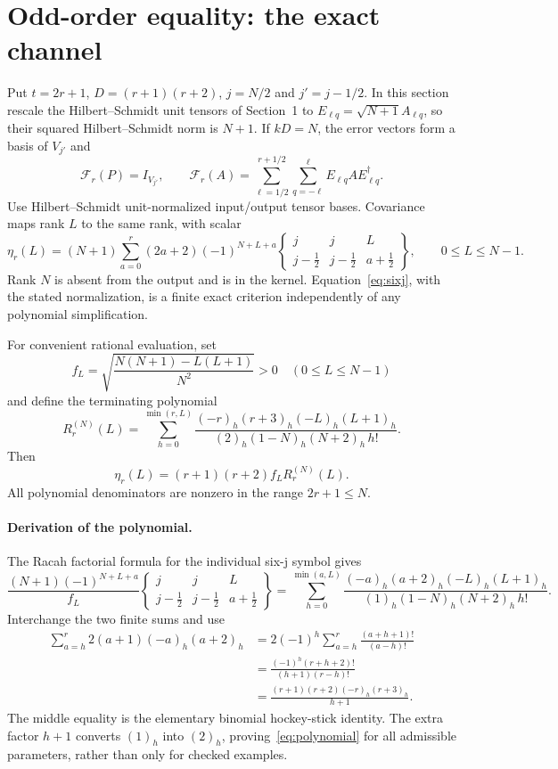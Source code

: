 \documentclass[11pt]{article}
\begin{document}
\section{Odd-order equality: the exact channel}
Put $t=2r+1$, $D=(r+1)(r+2)$, $j=N/2$ and $j'=j-1/2$. In this section rescale the Hilbert--Schmidt unit tensors of Section~1 to $E_{\ell q}=\sqrt{N+1}A_{\ell q}$, so their squared Hilbert--Schmidt norm is $N+1$. If $kD=N$, the error vectors form a basis of $V_{j'}$ and
\[
\mathcal F_r(P)=I_{V_{j'}},\qquad
\mathcal F_r(A)=\sum_{\ell=1/2}^{r+1/2}\sum_{q=-\ell}^{\ell}E_{\ell q}A E_{\ell q}^{\dagger}.
\]
Use Hilbert--Schmidt unit-normalized input/output tensor bases. Covariance maps rank $L$ to the same rank, with scalar
\begin{equation}\label{eq:sixj}
\eta_r(L)=(N+1)\sum_{a=0}^r(2a+2)(-1)^{N+L+a}
\begin{Bmatrix}
j&j&L\\ j-\tfrac12&j-\tfrac12&a+\tfrac12
\end{Bmatrix},\qquad 0\le L\le N-1.
\end{equation}
Rank $N$ is absent from the output and is in the kernel. Equation~\eqref{eq:sixj}, with the stated normalization, is a finite exact criterion independently of any polynomial simplification.

For convenient rational evaluation, set
\[
f_L=\sqrt{\frac{N(N+1)-L(L+1)}{N^2}}>0\quad (0\le L\le N-1)
\]
and define the terminating polynomial
\begin{equation}\label{eq:polynomial}
R_r^{(N)}(L)=\sum_{h=0}^{\min(r,L)}
\frac{(-r)_h(r+3)_h(-L)_h(L+1)_h}
{(2)_h(1-N)_h(N+2)_h\,h!}.
\end{equation}
Then
\[
\boxed{\eta_r(L)=(r+1)(r+2)f_L R_r^{(N)}(L).}
\]
All polynomial denominators are nonzero in the range $2r+1\le N$.

\paragraph{Derivation of the polynomial.}
The Racah factorial formula for the individual six-j symbol gives
\[
\frac{(N+1)(-1)^{N+L+a}}{f_L}
\begin{Bmatrix}j&j&L\\j-\tfrac12&j-\tfrac12&a+\tfrac12\end{Bmatrix}
=\sum_{h=0}^{\min(a,L)}
\frac{(-a)_h(a+2)_h(-L)_h(L+1)_h}
{(1)_h(1-N)_h(N+2)_h\,h!}.
\]
Interchange the two finite sums and use
\begin{align*}
\sum_{a=h}^r2(a+1)(-a)_h(a+2)_h
&=2(-1)^h\sum_{a=h}^r\frac{(a+h+1)!}{(a-h)!}\\
&=\frac{(-1)^h(r+h+2)!}{(h+1)(r-h)!}\\
&=\frac{(r+1)(r+2)(-r)_h(r+3)_h}{h+1}.
\end{align*}
The middle equality is the elementary binomial hockey-stick identity. The extra factor $h+1$ converts $(1)_h$ into $(2)_h$, proving~\eqref{eq:polynomial} for all admissible parameters, rather than only for checked examples.
\end{document}
